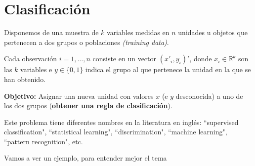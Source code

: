 \chapter{Clasificación}


Disponemos de una muestra de $k$ variables medidas en $n$ unidades u objetos que pertenecen a dos grupos o poblaciones \textit{(training data)}.

Cada observación $i=1,\ldots,n$ consiste en un vector $(x'_i,y_i)'$, donde $x_i\in\mathbb{R}^k$ son las $k$ variables e    $y\in\{0,1\}$ indica el grupo al que pertenece la unidad en la que se han obtenido. 

\textbf{Objetivo:} Asignar una nueva unidad con valores $x$ (e $y$ desconocida) a uno de los dos grupos (\textbf{obtener una regla de clasificación}).


Este problema tiene diferentes nombres en la literatura en inglés: ``supervised classification", ``statistical learning", ``discrimination", ``machine learning", ``pattern recognition", etc.

Vamos a ver un ejemplo, para entender mejor el tema

